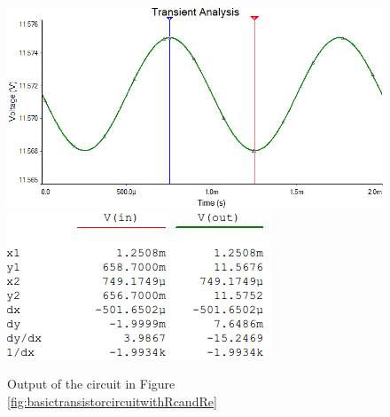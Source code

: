 \begin{figure}[htbp]
\centering
\includegraphics[scale=0.6]{"../Photo/Chap1/basic transistor ciruit output wave"}\\[0.5cm]
\includegraphics[scale=1]{"../Photo/Chap1/basic transistor ciruit output cursor data"}
\caption{Output of the circuit in Figure \ref{fig:basictransistorcircuitwithRcandRe} }
\label{fig:basictransistorciruitoutput}
\end{figure}

